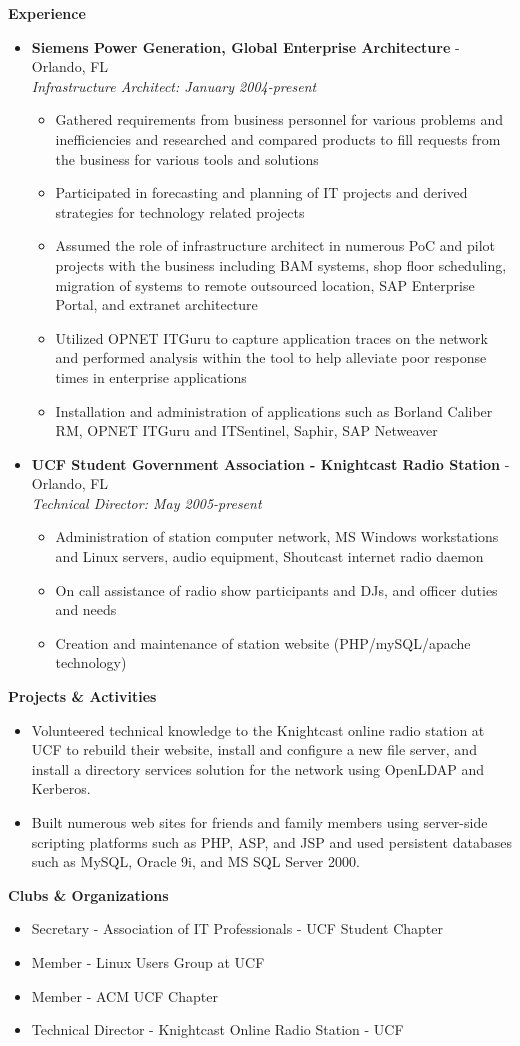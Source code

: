 \documentclass[10pt,oneside]{article}
\newenvironment{ressection}[1]{
	\vspace{4pt}
	\textbf{\selectfont\normalsize#1}
	\begin{itemize}
	\vspace{3pt}
}{
	\end{itemize}
}
\newcommand{\resitem}[1]{
	\vspace{-4pt}
	\item \begin{flushleft} #1 \end{flushleft}
}
\newcommand{\ressubitem}[1]{
	\vspace{-1pt}
	\item \begin{flushleft} #1 \end{flushleft}
}
\newcommand{\resbigitem}[3]{
	\vspace{-5pt}
	\item
	\textbf{#1} - #2 \\
	\textit{#3}
}
\newenvironment{ressubsec}[3]{
	\resbigitem{#1}{#2}{#3}
	\vspace{-2pt}
	\begin{itemize}
}{
	\end{itemize}
}
\begin{document}
\begin{ressection}{Experience}

	\begin{ressubsec}{Siemens Power Generation, Global Enterprise Architecture}{Orlando, FL}{Infrastructure Architect: January 2004-present}
		\ressubitem{Gathered requirements from business personnel for various problems and inefficiencies and researched and compared products to fill requests from the business for various tools and solutions}
		\ressubitem{Participated in forecasting and planning of IT projects and derived strategies for technology related projects}
		\ressubitem{Assumed the role of infrastructure architect in numerous PoC and pilot projects with the business including BAM systems, shop floor scheduling, migration of systems to remote outsourced location, SAP Enterprise Portal, and extranet architecture}
		\ressubitem{Utilized OPNET ITGuru to capture application traces on the network and performed analysis within the tool to help alleviate poor response times in enterprise applications}
		\ressubitem{Installation and administration of applications such as Borland Caliber RM, OPNET ITGuru and ITSentinel, Saphir, SAP Netweaver}
	\end{ressubsec}

	\begin{ressubsec}{UCF Student Government Association - Knightcast Radio Station}{Orlando, FL}{Technical Director: May 2005-present}
		\ressubitem{Administration of station computer network, MS Windows workstations and Linux servers, audio equipment, Shoutcast internet radio daemon}
		\ressubitem{On call assistance of radio show participants and DJs, and officer duties and needs}
		\ressubitem{Creation and maintenance of station website (PHP/mySQL/apache technology)}
	\end{ressubsec}

\end{ressection}


\begin{ressection}{Projects \& Activities}

	\resitem{Volunteered technical knowledge to the Knightcast online radio station at UCF to rebuild their website, install and configure a new file server, and install a directory services solution for the network using OpenLDAP and Kerberos.}
	\resitem{Built numerous web sites for friends and family members using server-side scripting platforms such as PHP, ASP, and JSP and used persistent databases such as MySQL, Oracle 9i, and MS SQL Server 2000.}

\end{ressection}


\begin{ressection}{Clubs \& Organizations}

	\resitem{Secretary - Association of IT Professionals - UCF Student Chapter}
	\resitem{Member - Linux Users Group at UCF}
	\resitem{Member - ACM UCF Chapter}
	\resitem{Technical Director - Knightcast Online Radio Station - UCF}

\end{ressection}

\end{document}

